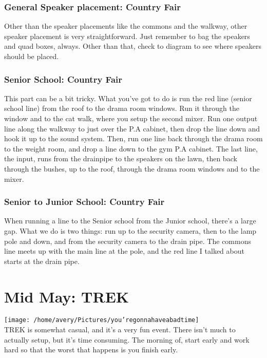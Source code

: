 \documentclass[11pt,a4paper]{book}
\begin{document}
\subsection{General Speaker placement: Country Fair}
Other than the speaker placements like the commons and the walkway, other speaker placement is very straightforward. Just remember to bag the speakers and quad boxes, always. Other than that, check to diagram to see where speakers should be placed. 
\subsection{Senior School: Country Fair}
This part can be a bit tricky. What you've got to do is run the red line (senior school line) from the roof to the drama room windows. Run it through the window and to the cat walk, where you setup the second mixer. Run one output line along the walkway to just over the P.A cabinet, then drop the line down and hook it up to the sound system. Then, run one line back through the drama room to the weight room, and drop a line down to the gym P.A cabinet. The last line, the input, runs from the drainpipe to the speakers on the lawn, then back through the bushes, up to the roof, through the drama room windows and to the mixer.
\subsection{Senior to Junior School: Country Fair}
When running a line to the Senior school from the Junior school, there's a large gap. What we do is two things: run up to the security camera, then to the lamp pole and down, and from the security camera to the drain pipe. The commons line meets up with the main line at the pole, and the red line I talked about starts at the drain pipe. 

\chapter{Mid May: TREK}
\texttt{[image: /home/avery/Pictures/you'regonnahaveabadtime]}\\
TREK is somewhat casual, and it's a very fun event. There isn't much to actually setup, but it's time consuming. The morning of, start early and work hard so that the worst that happens is you finish early. 
\end{document}
